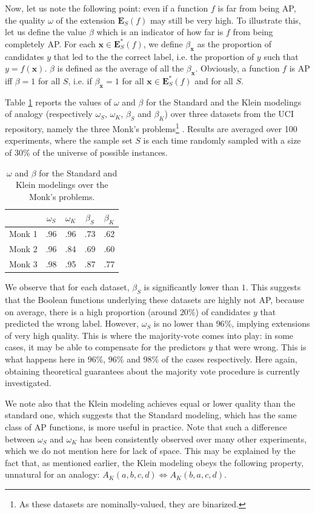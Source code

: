 Now, let us note the following point: even if a function $f$ is far from being
AP, the quality $\omega$ of the extension $\mathbf{E}_S(f)$ may still be very
high. To illustrate this, let us define the value $\beta$ which is an indicator
of how far is $f$ from being completely AP.  For each $\mathbf{x} \in
\mathbf{E}^*_S(f)$, we define $\beta_\mathbf{x}$ as the proportion of
candidates $y$ that led to the the correct label, i.e. the proportion of $y$
such that $y = f(\mathbf{x})$. $\beta$ is defined as the average of all the
$\beta_\mathbf{x}$.  Obviously, a function $f$ is AP iff $\beta = 1$ for all
$S$, i.e. if $\beta_\mathbf{x} = 1$ for all $\mathbf{x} \in \mathbf{E}^*_S(f)$
and for all $S$.

Table \ref{table_monks} reports the values of $\omega$ and $\beta$ for the
Standard and the Klein modelings of analogy (respectively $\omega_S$,
$\omega_K$, $\beta_S$ and $\beta_K$) over three datasets from the UCI
repository, namely the three Monk's problems\footnote{As these datasets are
nominally-valued, they are binarized.} \cite{UCIrepo}. Results are averaged
over 100 experiments, where the sample set $S$ is each time randomly sampled
with a size of $30$\% of the universe of possible instances.

\begin{table}
\centering
\begin{tabular}{| c | c | c | c | c |}
\toprule
  & $\omega_S$  & $\omega_K$ & $\beta_S$  &  $\beta_K$ \\
\midrule
Monk 1 & .96 & .96 & .73 & .62 \\
Monk 2 & .96 & .84 & .69 & .60 \\
Monk 3 & .98 & .95 & .87 & .77 \\
\bottomrule
\end{tabular}
\caption{$\omega$ and $\beta$ for the Standard and Klein modelings over the
  Monk's problems.}
\label{table_monks}
\end{table}

We observe that for each dataset, $\beta_S$ is significantly lower than $1$.
This suggests that the Boolean functions underlying these
datasets are highly not AP, because on average, there is a high proportion
(around $20$\%) of candidates $y$ that predicted the wrong label. However,
$\omega_S$ is no lower than $96$\%, implying extensions of very high quality.
This is where the majority-vote comes into play: in some cases, it may be able
to compensate for the predictors $y$ that were wrong.  This is what happens
here in $96$\%, $96$\% and $98$\% of the cases respectively. Here again,
obtaining theoretical guarantees about the majority vote procedure is currently
investigated.

We note also that the Klein modeling achieves equal or lower quality than the
standard one, which suggests that the Standard modeling, which has the same
class of AP functions, is more useful in practice. Note that such a difference
between $\omega_S$ and $\omega_K$ has been consistently observed over many
other experiments, which we do not mention here for lack of space. This may be
explained by the fact that, as mentioned earlier, the Klein modeling obeys
the following property, unnatural  for an analogy: $A_K(a, b, c, d)
\iff A_K(b, a, c, d)$.
